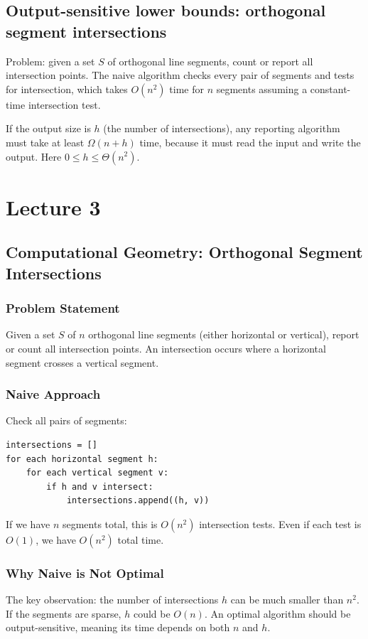\documentclass[11pt]{article}
\begin{document}
\subsection*{Output-sensitive lower bounds: orthogonal segment intersections}
Problem: given a set $S$ of orthogonal line segments, count or report all intersection points.
The naive algorithm checks every pair of segments and tests for intersection, which takes
$O(n^2)$ time for $n$ segments assuming a constant-time intersection test.

If the output size is $h$ (the number of intersections), any reporting algorithm must take at least
\(\Omega(n + h)\) time, because it must read the input and write the output. Here
$0 \le h \le \Theta(n^2)$.

\section{Lecture 3}

\subsection*{Computational Geometry: Orthogonal Segment Intersections}

\subsubsection*{Problem Statement}
Given a set $S$ of $n$ orthogonal line segments (either horizontal or vertical), report or count all intersection points. An intersection occurs where a horizontal segment crosses a vertical segment.

\subsubsection*{Naive Approach}
Check all pairs of segments:
\begin{lstlisting}
intersections = []
for each horizontal segment h:
    for each vertical segment v:
        if h and v intersect:
            intersections.append((h, v))
\end{lstlisting}

If we have $n$ segments total, this is $O(n^2)$ intersection tests. Even if each test is $O(1)$, we have $O(n^2)$ total time.

\subsubsection*{Why Naive is Not Optimal}
The key observation: the number of intersections $h$ can be much smaller than $n^2$. If the segments are sparse, $h$ could be $O(n)$. An optimal algorithm should be output-sensitive, meaning its time depends on both $n$ and $h$.
\end{document}
